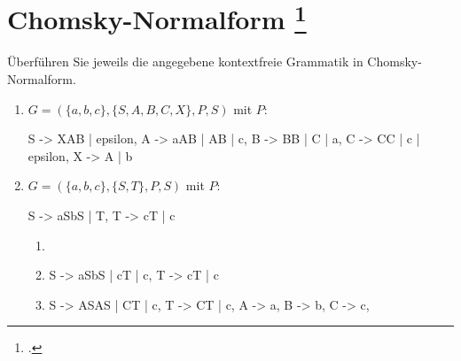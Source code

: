 \documentclass{lehramt-informatik-aufgabe}
\begin{document}
\let\schrittE=\liChomskyUeberErklaerung

\section{Chomsky-Normalform
\footcite{theo:ab:2}}

Überführen Sie jeweils die angegebene kontextfreie Grammatik in
Chomsky-Normalform.

\begin{enumerate}

%

\item $G = (\{a, b, c\}, \{S, A, B, C, X\}, P, S)$ mit $P$:

\begin{liProduktionsRegeln}
S -> XAB | epsilon,
A -> aAB | AB | c,
B -> BB | C | a,
C -> CC | c | epsilon,
X -> A | b
\end{liProduktionsRegeln}

%

\item $G = (\{a, b, c\}, \{S, T\}, P, S)$ mit $P$:

\begin{liProduktionsRegeln}
S -> aSbS | T,
T -> cT | c
\end{liProduktionsRegeln}

\begin{liAntwort}
\begin{enumerate}
\item \schrittE{1}

\liNichtsZuTun

\item \schrittE{2}

\begin{liProduktionsRegeln}
S -> aSbS | cT | c,
T -> cT | c
\end{liProduktionsRegeln}

\item \schrittE{3}

\begin{liProduktionsRegeln}
S -> ASAS | CT | c,
T -> CT | c,
A -> a,
B -> b,
C -> c,
\end{liProduktionsRegeln}


\end{enumerate}
\end{liAntwort}
\end{enumerate}
\end{document}
